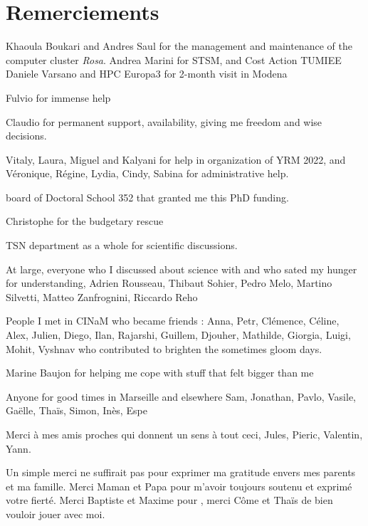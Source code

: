 \chapter*{Remerciements}

Khaoula Boukari and Andres Saul for the management and maintenance of the computer cluster \textit{Rosa}. 
Andrea Marini for STSM, and Cost Action TUMIEE
Daniele Varsano and HPC Europa3 for 2-month visit in Modena

Fulvio for immense help

Claudio for permanent support, availability, giving me freedom and wise decisions.

Vitaly, Laura, Miguel and Kalyani for help in organization of YRM 2022, and Véronique, Régine, Lydia, Cindy, Sabina for administrative help.

board of Doctoral School 352 that granted me this PhD funding. 

Christophe for the budgetary rescue

TSN department as a whole for scientific discussions.

At large, everyone who I discussed about science with and who sated my hunger for understanding, Adrien Rousseau, Thibaut Sohier, Pedro Melo, Martino Silvetti, Matteo Zanfrognini, Riccardo Reho

People I met in CINaM who became friends : Anna, Petr, Clémence, Céline, Alex, Julien, Diego, Ilan, Rajarshi, Guillem, Djouher, Mathilde, Giorgia, Luigi,  Mohit, Vyshnav
who contributed to brighten the sometimes gloom days. 


Marine Baujon for helping me cope with stuff that felt bigger than me

Anyone for good times in Marseille and elsewhere Sam, Jonathan, Pavlo, Vasile, Gaëlle, Thaïs, Simon, Inès, Espe

Merci à mes amis proches qui donnent un sens à tout ceci, Jules, Pieric, Valentin, Yann.

Un simple merci ne suffirait pas pour exprimer ma gratitude envers mes parents et ma famille. Merci Maman et Papa pour m'avoir toujours soutenu et exprimé votre fierté. Merci Baptiste et Maxime pour 
, merci Côme et Thaïs de bien vouloir jouer avec moi.